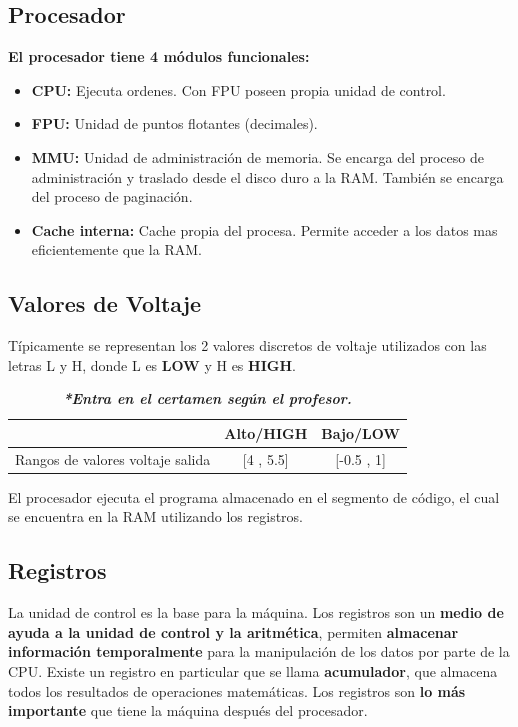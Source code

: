 \documentclass{templateNote}
\begin{document}
\subsection*{Procesador}
\noindent \textbf{El procesador tiene 4 módulos funcionales:}
\begin{itemize}
    \item \textbf{CPU:} Ejecuta ordenes. Con FPU poseen propia unidad de control.
    \item \textbf{FPU:} Unidad de puntos flotantes (decimales).
    \item \textbf{MMU:} Unidad de administración de memoria. Se encarga del proceso de administración y traslado desde el disco duro a la RAM. 
                        También se encarga del proceso de paginación.
    \item \textbf{Cache interna:} Cache propia del procesa. Permite acceder a los datos mas eficientemente que la RAM.
\end{itemize}

\subsection*{\textbf{Valores de Voltaje}} 
\noindent Típicamente se representan los 2 valores discretos de voltaje utilizados con las letras L y H, donde L es \textbf{LOW} y H es \textbf{HIGH}. 
\begin{table} [h]
    \centering
    \colorbox{yellow!20}{%
        \begin{tabular}{|c|c|c|}
            \hline
            & \textbf{Alto/HIGH} & \textbf{Bajo/LOW}\\
            \hline
            Rangos de valores voltaje salida & [4 , 5.5] & [-0.5 , 1]\\
            \hline
        \end{tabular}
    }
    \label{tab:Voltajes}
    \caption*{\textbf{\textit{*Entra en el certamen según el profesor.}}}
\end{table}

\noindent El procesador ejecuta el programa almacenado en el segmento de código, el cual se encuentra en la RAM utilizando los registros.

\subsection*{\textbf{Registros}}
\noindent La unidad de control es la base para la máquina. Los registros son un \textbf{medio de ayuda a la unidad de control y la aritmética}, 
permiten \textbf{almacenar información temporalmente} para la manipulación de los datos por parte de la CPU. Existe un registro en particular 
que se llama \textbf{acumulador}, que almacena todos los resultados de operaciones matemáticas. Los registros son \textbf{lo más importante} 
que tiene la máquina después del procesador.
\end{document}

